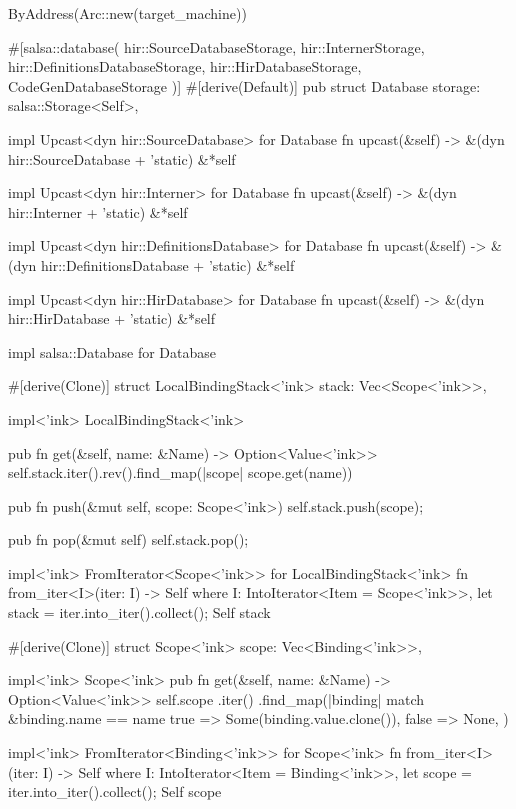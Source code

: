\documentclass[
  oneside,
  english,
  coorientadorbanca,
  noabntexcite
]{ufsc-thesis-rn46-2019}
\begin{document}
\begin{rustcode}
{    ByAddress(Arc::new(target_machine))
}

#[salsa::database(
    hir::SourceDatabaseStorage,
    hir::InternerStorage,
    hir::DefinitionsDatabaseStorage,
    hir::HirDatabaseStorage,
    CodeGenDatabaseStorage
)]
#[derive(Default)]
pub struct Database {
    storage: salsa::Storage<Self>,
}

impl Upcast<dyn hir::SourceDatabase> for Database {
    fn upcast(&self) -> &(dyn hir::SourceDatabase + 'static) {
        &*self
    }
}

impl Upcast<dyn hir::Interner> for Database {
    fn upcast(&self) -> &(dyn hir::Interner + 'static) {
        &*self
    }
}

impl Upcast<dyn hir::DefinitionsDatabase> for Database {
    fn upcast(&self) -> &(dyn hir::DefinitionsDatabase + 'static) {
        &*self
    }
}

impl Upcast<dyn hir::HirDatabase> for Database {
    fn upcast(&self) -> &(dyn hir::HirDatabase + 'static) {
        &*self
    }
}

impl salsa::Database for Database {}

#[derive(Clone)]
struct LocalBindingStack<'ink> {
    stack: Vec<Scope<'ink>>,
}

impl<'ink> LocalBindingStack<'ink> {
    pub fn get(&self, name: &Name) -> Option<Value<'ink>> {
        self.stack.iter().rev().find_map(|scope| scope.get(name))
    }

    pub fn push(&mut self, scope: Scope<'ink>) {
        self.stack.push(scope);
    }

    pub fn pop(&mut self) {
        self.stack.pop();
    }
}

impl<'ink> FromIterator<Scope<'ink>> for LocalBindingStack<'ink> {
    fn from_iter<I>(iter: I) -> Self
    where
        I: IntoIterator<Item = Scope<'ink>>,
    {
        let stack = iter.into_iter().collect();
        Self { stack }
    }
}

#[derive(Clone)]
struct Scope<'ink> {
    scope: Vec<Binding<'ink>>,
}

impl<'ink> Scope<'ink> {
    pub fn get(&self, name: &Name) -> Option<Value<'ink>> {
        self.scope
            .iter()
            .find_map(|binding| match &binding.name == name {
                true => Some(binding.value.clone()),
                false => None,
            })
    }
}

impl<'ink> FromIterator<Binding<'ink>> for Scope<'ink> {
    fn from_iter<I>(iter: I) -> Self
    where
        I: IntoIterator<Item = Binding<'ink>>,
    {
        let scope = iter.into_iter().collect();
        Self { scope }
    }
}


\end{rustcode}
\end{document}
